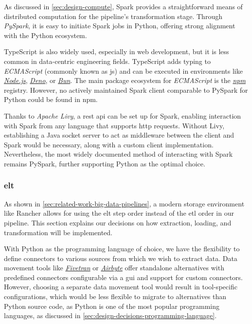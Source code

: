 As discussed in \cref{sec:design-compute}, Spark provides a straightforward means of distributed computation for the pipeline's transformation stage.
Through \textit{PySpark}, it is easy to initiate Spark jobs in Python, offering strong alignment with the Python ecosystem.

TypeScript is also widely used, especially in web development, but it is less common in data-centric engineering fields.
TypeScript adds typing to \textit{ECMAScript} (commonly known as \ac{js}) and can be executed in environments like \href{https://nodejs.org/}{\textit{Node.js}}, \href{https://deno.com/}{\textit{Deno}}, or \href{https://bun.sh/}{\textit{Bun}}.
The main package ecosystem for \textit{ECMAScript} is the \href{https://www.npmjs.com/}{\textit{npm}} registry.
However, no actively maintained Spark client comparable to PySpark for Python could be found in npm.

Thanks to \textit{Apache Livy}, a \ac{rest} \ac{api} can be set up for Spark, enabling interaction with Spark from any language that supports \ac{http} requests.
Without Livy, establishing a Java socket server to act as middleware between the client and Spark would be necessary, along with a custom client implementation.
Nevertheless, the most widely documented method of interacting with Spark remains PySpark, further supporting Python as the optimal choice.


\subsubsection{\ac{elt}}
\label{sec:design-decisions-elt}

As shown in \cref{sec:related-work-big-data-pipelines}, a modern storage environment like Rancher allows for using the \ac{elt} step order instead of the \ac{etl} order in our pipeline.
This section explains our decisions on how extraction, loading, and transformation will be implemented.

With Python as the programming language of choice, we have the flexibility to define connectors to various sources from which we wish to extract data.
Data movement tools like \href{https://www.fivetran.com/}{\textit{Fivetran}} or \href{https://airbyte.com/}{\textit{Airbyte}} offer standalone alternatives with predefined connectors configurable via a \ac{gui} and support for custom connectors.
However, choosing a separate data movement tool would result in tool-specific configurations, which would be less flexible to migrate to alternatives than Python source code, as Python is one of the most popular programming languages, as discussed in \cref{sec:design-decisions-programming-language}.


